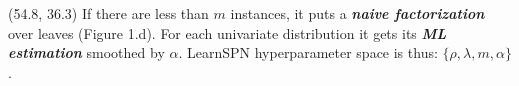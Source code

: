 \documentclass[final]{beamer}
\begin{document}
\begin{frame}{}
    
    
  
  
  \begin{textblock}{25.2}(54.8, 36.3)
    \footnotesize
    If there are less than $m$ instances, it puts a \textbf{\emph{naive
        factorization}} over leaves (Figure 1.d). For each univariate distribution
    it gets its \emph{\textbf{ML estimation}} smoothed by $\alpha$. LearnSPN
    hyperparameter space is thus: $\{\rho, \lambda, m, \alpha\}$.\par\bigskip
    

\end{textblock}
\end{frame}
\end{document}
